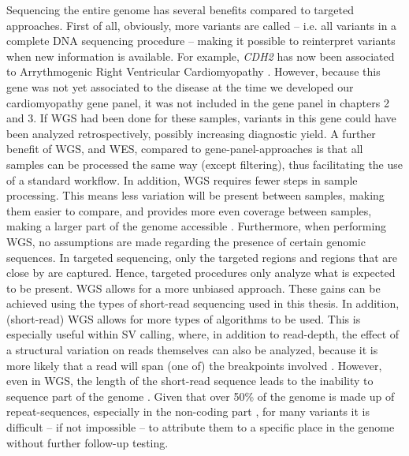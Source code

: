 Sequencing the entire genome has several benefits compared to targeted approaches. 
First of all, obviously, more variants are called – i.e. all variants in a complete DNA sequencing procedure – making it possible to reinterpret variants when new information is available. 
For example, \textsl{CDH2} has now been associated to Arrythmogenic Right Ventricular Cardiomyopathy \cite{Mayosi_2017}.
However, because this gene was not yet associated to the disease at the time we developed our cardiomyopathy gene panel, it was not included in the gene panel in chapters 2 and 3. 
If WGS had been done for these samples, variants in this gene could have been analyzed retrospectively, possibly increasing diagnostic yield. 
A further benefit of WGS, and WES, compared to gene-panel-approaches is that all samples can be processed the same way (except filtering), thus facilitating the use of a standard workflow. 
In addition, WGS requires fewer steps in sample processing. This means less variation will be present between samples, making them easier to compare, and provides more even coverage between samples, making a larger part of the genome accessible \cite{Meienberg_2016}.
Furthermore, when performing WGS, no assumptions are made regarding the presence of certain genomic sequences. 
In targeted sequencing, only the targeted regions and regions that are close by are captured. 
Hence, targeted procedures only analyze what is expected to be present. WGS allows for a more unbiased approach. 
These gains can be achieved using the types of short-read sequencing used in this thesis. 
In addition, (short-read) WGS allows for more types of algorithms to be used. 
This is especially useful within SV calling, where, in addition to read-depth, the effect of a structural variation on reads themselves can also be analyzed, because it is more likely that a read will span (one of) the breakpoints involved \cite{Rausch_2012}. 
However, even in WGS, the length of the short-read sequence leads to the inability to sequence part of the genome \cite{Mandelker_2016}.
Given that over 50\% of the genome is made up of repeat-sequences, especially in the non-coding part \cite{Jain_2018a}, for many variants it is difficult – if not impossible – to attribute them to a specific place in the genome without further follow-up testing.


